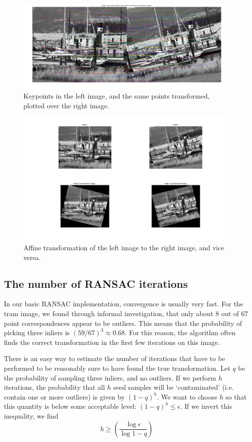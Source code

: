 \documentclass[a4paper,10pt]{article}
\begin{document}
\begin{figure}
\includegraphics[width=1\textwidth]{img/matchingpoints}
\caption{Keypoints in the left image, and the same points transformed, plotted over the right image.}
\label{fig:matches}
\end{figure}

\begin{figure}
\includegraphics[width=1\textwidth]{img/transformedimg}
\caption{Affine transformation of the left image to the right image, and vice versa.}
\label{fig:transformedA}
\end{figure}

\subsection{The number of RANSAC iterations}
In our basic RANSAC implementation, convergence is usually very fast.
For the tram image, we found through informal investigation, that only about 8 out of 67 point correspondences appear to be outliers.
This means that the probability of picking three inliers is $(59/67)^3 \approx 0.68$.
For this reason, the algorithm often finds the correct transformation in the first few iterations on this image.

There is an easy way to estimate the number of iterations that have to be performed to be reasonably sure to have found the true transformation.
Let $q$ be the probability of sampling three inliers, and no outliers.
If we perform $h$ iterations, the probability that all $h$ seed samples will be `contaminated' (i.e. contain one or more outliers) is given by $(1-q)^h$.
We want to choose $h$ so that this quantity is below some acceptable level: $(1-q)^h \leq \epsilon$.
If we invert this inequality, we find
\begin{equation}
h \geq \left( \frac{\log \epsilon}{\log{1-q}} \right)
\end{equation}
\end{document}
